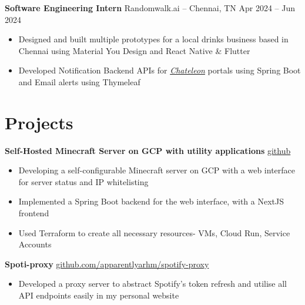 \documentclass[11pt]{article}       %
\begin{document}
\textbf{Software Engineering Intern} {Randomwalk.ai} -- Chennai, TN \hfill Apr 2024 -- Jun 2024 \\
\vspace{-9pt}
\begin{itemize}
    \item Designed and built multiple prototypes for a local drinks business
          based in Chennai using Material You Design and React Native \& Flutter
    \item Developed Notification Backend APIs for
        \textit{\href{https://chateleon.com}{Chateleon}} portals using Spring Boot and
        Email alerts using Thymeleaf
\end{itemize}


\vspace{-18.5pt}

\section*{Projects}
\textbf{Self-Hosted Minecraft Server on GCP with utility applications} \hfill \href{https://github.com/apparentlyarhm/minecraft-terraform}{github} \\
\vspace{-9pt}
\begin{itemize}
    \item{ Developing a self-configurable Minecraft server on GCP with a web interface for server status and IP whitelisting}
    \item {Implemented a Spring Boot backend for the web interface, with a NextJS frontend}
    \item {Used Terraform to create all necessary resources- VMs, Cloud Run, Service Accounts}
\end{itemize}

\textbf{Spoti-proxy} \hfill \href{https://github.com/apparentlyarhm/spotify-proxy}{github.com/apparentlyarhm/spotify-proxy} \\
\vspace{-9pt}
\begin{itemize}
    \item {Developed a proxy server to abstract Spotify's token refresh and utilise all API endpoints easily in my personal website}

\end{itemize}
\end{document}
